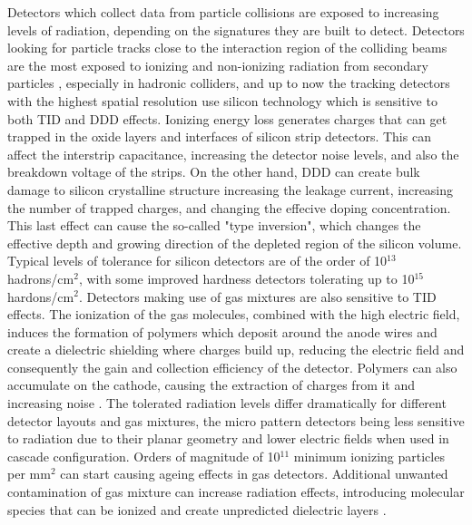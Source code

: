 \documentclass[twoside,a4paper]{article}
\begin{document}
Detectors which collect data from particle collisions are exposed to increasing levels of radiation, depending on the signatures they are built to detect. Detectors looking for particle tracks close to the interaction region of the colliding beams are the most exposed to ionizing and non-ionizing radiation from secondary particles \cite{atlas,cmstdr,babar}, especially in hadronic colliders, and up to now the tracking detectors with the highest spatial resolution use silicon technology which is sensitive to both TID and DDD effects.
Ionizing energy loss generates charges that can get trapped in the oxide layers and interfaces of silicon strip detectors. This can affect the interstrip capacitance, increasing the detector noise levels, and also the breakdown voltage of the strips. On the other hand, DDD can create bulk damage to silicon crystalline structure increasing the leakage current, increasing the number of trapped charges, and changing the effecive doping concentration. This last effect can cause the so-called "type inversion", which changes the effective depth and growing direction of the depleted region of the silicon volume.
Typical levels of tolerance for silicon detectors are of the order of 10$^{13}$ hadrons/cm$^2$, with some improved hardness detectors tolerating up to 10$^{15}$ hardons/cm$^2$. 
Detectors making use of gas mixtures are also sensitive to TID effects. The ionization of the gas molecules, combined with the high electric field,  induces the formation of polymers which deposit around the anode wires and create a dielectric shielding where charges build up, reducing the electric field and consequently the gain and collection efficiency of the detector. Polymers can also accumulate on the cathode, causing the extraction of charges from it and increasing noise \cite{capeans}. The tolerated radiation levels differ dramatically for different detector layouts and gas mixtures, the micro pattern detectors being less sensitive to radiation due to their planar geometry and lower electric fields when used in cascade configuration. Orders of magnitude of 10$^{11}$ minimum ionizing particles per mm$^2$ can start causing ageing effects in gas detectors. Additional unwanted contamination of gas mixture can increase radiation effects, introducing  molecular species that can be ionized and create unpredicted dielectric layers \cite{capeans}. 
\end{document}
